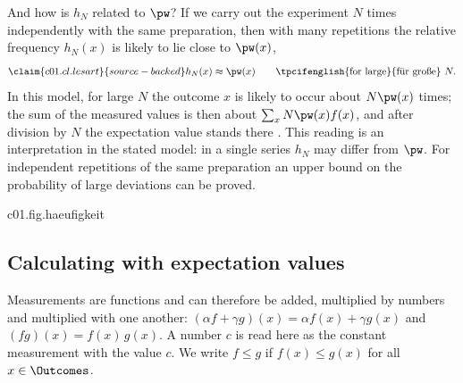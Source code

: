 And how is $h_N$ related to $\pw$? If we carry out the experiment $N$ times independently
with the same preparation, then with many repetitions the relative frequency $h_N(x)$ is
likely to lie close to $\pw(x)$,
\begin{equation}\label{c01.eq.lesart}\claim{c01.cl.lesart}{source-backed}
  h_N(x) \approx \pw(x)
  \qquad \text{\tpcifenglish{for large}{für große}}\ N .
\end{equation}
In this model, for large $N$ the outcome $x$ is likely to occur about $N \pw(x)$ times;
the sum of the measured values is then about
$\sum_x N \pw(x) f(x)$, and after division by $N$ the expectation value stands there
. This reading
is an interpretation in the stated model: in a single series $h_N$ may differ from $\pw$.
For independent repetitions of the same preparation an upper bound on the probability of
large deviations can be proved.

\begin{tpcfigure}{c01.fig.haeufigkeit}
  \caption{A series of throws with the loaded die of equation~\eqref{c01.eq.gezinkt},
    generated by a computer program with a fixed seed. Hatched bars: relative frequencies
    $h_N(x)$ after the first (a) $12$, (b) $120$ and (c) $1200$ throws of the same series.
    Heavy horizontal marks: the weights $\pw(x)$. In (a) the bars lie far from the marks,
    in (c) close to them. The bars of one picture always have total height $1$, as in
    equation~\eqref{c01.eq.haeufigkeit}.}
\end{tpcfigure}

\subsection{Calculating with expectation values}\label{c01.s2.2}

Measurements are functions and can therefore be added, multiplied by numbers and
multiplied with one another: $(\alpha f + \gamma g)(x) = \alpha f(x) + \gamma g(x)$ and
$(fg)(x) = f(x)\,g(x)$. A number $c$ is read here as the constant measurement with the
value $c$. We write $f \leq g$ if $f(x) \leq g(x)$ for all $x \in \Outcomes$.


